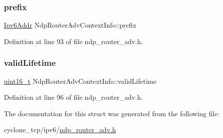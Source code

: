 \subsubsection{\texorpdfstring{prefix}{prefix}}
{\footnotesize\ttfamily \hyperlink{ipv6_8h_aed0cbc40c61ed5b4fb681ebc55237e89}{Ipv6\+Addr} Ndp\+Router\+Adv\+Context\+Info\+::prefix}



Definition at line 93 of file ndp\+\_\+router\+\_\+adv.\+h.

\mbox{\label{structNdpRouterAdvContextInfo_abba7398773c7476c4969f3b31c90ac48}} 
\subsubsection{\texorpdfstring{valid\+Lifetime}{validLifetime}}
{\footnotesize\ttfamily \hyperlink{stdint_8h_a273cf69d639a59973b6019625df33e30}{uint16\+\_\+t} Ndp\+Router\+Adv\+Context\+Info\+::valid\+Lifetime}



Definition at line 96 of file ndp\+\_\+router\+\_\+adv.\+h.



The documentation for this struct was generated from the following file\+:\begin{DoxyCompactItemize}
\item 
cyclone\+\_\+tcp/ipv6/\hyperlink{ndp__router__adv_8h}{ndp\+\_\+router\+\_\+adv.\+h}\end{DoxyCompactItemize}
